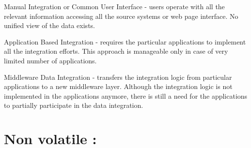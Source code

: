 \documentclass{article}
\begin{document}
Manual Integration or Common User Interface - users operate with all the relevant information accessing all the source systems or web page interface. No unified view of the data exists.

Application Based Integration - requires the particular applications to implement all the integration efforts. This approach is manageable only in case of very limited number of applications.

Middleware Data Integration - transfers the integration logic from particular applications to a new middleware layer. Although the integration logic is not implemented in the applications anymore, there is still a need for the applications to partially participate in the data integration.
  \newpage
 \section{ Non volatile :}
 
\end{document}
